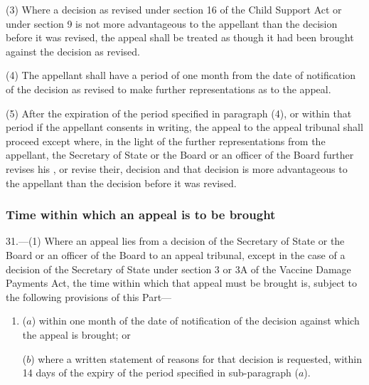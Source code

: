 \documentclass[12pt,a4paper]{article}
\begin{document}
(3) Where a decision as revised under section 16 of the Child Support Act or under section 9 is not more advantageous to the appellant than the decision before it was revised, the appeal shall be treated as though it had been brought against the decision as revised.

(4) The appellant shall have a period of one month from the date of notification of the decision as revised to make further representations as to the appeal.

(5) After the expiration of the period specified in paragraph (4), or within that period if the appellant consents in writing, the appeal to the appeal tribunal shall proceed except where, in the light of the further representations from the appellant, the Secretary of State 
or the Board or an officer of the Board  %
further revises his%
, or revise their,  %
decision and that decision is more advantageous to the appellant than the decision before it was revised.


\subsubsection[31. Time within which an appeal is to be brought]{Time within which an appeal is to be brought}

31.—(1) Where an appeal lies from a decision of the Secretary of State 
or the Board or an officer of the Board  %
to an appeal tribunal, except in the case of a decision of the Secretary of State under section 3 or 3A of the Vaccine Damage Payments Act, the time within which that appeal must be brought is, subject to the following provisions of this Part—
\begin{enumerate}\item[]
($a$) within one month of the date of notification of the decision against which the appeal is brought; or

($b$) where a written statement of reasons for that decision is requested, within 14 days of the expiry of the period specified in sub-paragraph ($a$).
\end{enumerate}
\end{document}
